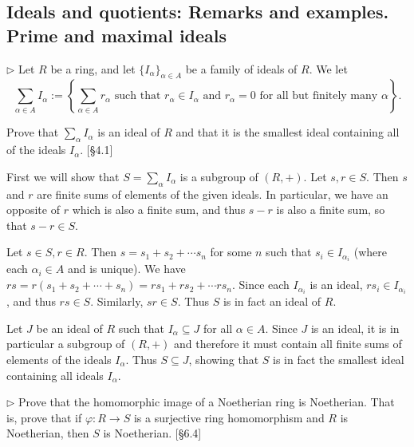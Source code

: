 \subsection{Ideals and quotients: Remarks and examples. Prime and maximal ideals}

\begin{problem}
	$\triangleright$ Let $R$ be a ring, and let $\{I_\alpha\}_{\alpha \in A}$ be a family of ideals of $R$. We let
	\[
		\sum_{\alpha \in A} I_\alpha := \left\{ \sum_{\alpha \in A} r_\alpha \text{ such that } r_\alpha \in I_\alpha \text{ and } r_\alpha = 0 \text{ for all but finitely many } \alpha \right\} \text{.}
	\]
	
	Prove that $\sum_\alpha I_\alpha$ is an ideal of $R$ and that it is the smallest ideal containing all of the ideals $I_\alpha$. [\S 4.1]
\end{problem}

\begin{solution}
	First we will show that $S = \sum_\alpha I_\alpha$ is a subgroup of $(R, +)$. Let $s, r \in S$. Then $s$ and $r$ are finite sums of elements of the given ideals. In particular, we have an opposite of $r$ which is also a finite sum, and thus $s - r$ is also a finite sum, so that $s - r \in S$.
	
	Let $s \in S, r \in R$. Then $s = s_1 + s_2 + \cdots s_n$ for some $n$ such that $s_i \in I_{\alpha_i}$ (where each $\alpha_i \in A$ and is unique). We have $rs = r(s_1 + s_2 + \cdots + s_n) = rs_1 + rs_2 + \cdots rs_n$. Since each $I_{\alpha_i}$ is an ideal, $rs_i \in I_{\alpha_i}$, and thus $rs \in S$. Similarly, $sr \in S$. Thus $S$ is in fact an ideal of $R$.
	
	Let $J$ be an ideal of $R$ such that $I_\alpha \subseteq J$ for all $\alpha \in A$. Since $J$ is an ideal, it is in particular a subgroup of $(R, +)$ and therefore it must contain all finite sums of elements of the ideals $I_\alpha$. Thus $S \subseteq J$, showing that $S$ is in fact the smallest ideal containing all ideals $I_\alpha$.
\end{solution}

\begin{problem}
	$\triangleright$ Prove that the homomorphic image of a Noetherian ring is Noetherian. That is, prove that if $\varphi: R \to S$ is a surjective ring homomorphism and $R$ is Noetherian, then $S$ is Noetherian. [\S 6.4]
\end{problem}

